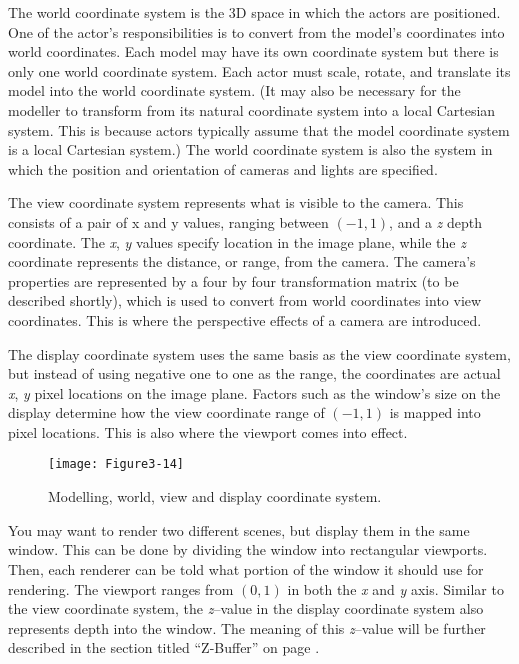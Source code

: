 The world coordinate system is the 3D space in which the actors are positioned. One of the actor's responsibilities is to convert from the model's coordinates into world coordinates. Each model may have its own coordinate system but there is only one world coordinate system. Each actor must scale, rotate, and translate its model into the world coordinate system. (It may also be necessary for the modeller to transform from its natural coordinate system into a local Cartesian system. This is because actors typically assume that the model coordinate system is a local Cartesian system.) The world coordinate system is also the system in which the position and orientation of cameras and lights are specified.

The view coordinate system represents what is visible to the camera. This consists of a pair of x and y values, ranging between $(-1,1)$, and a \emph{z} depth coordinate. The \emph{x}, \emph{y} values specify location in the image plane, while the \emph{z} coordinate represents the distance, or range, from the camera. The camera's properties are represented by a four by four transformation matrix (to be described shortly), which is used to convert from world coordinates into view coordinates. This is where the perspective effects of a camera are introduced.

The display coordinate system uses the same basis as the view coordinate system, but instead of using negative one to one as the range, the coordinates are actual \emph{x}, \emph{y} pixel locations on the image plane. Factors such as the window's size on the display determine how the view coordinate range of $(-1,1)$ is mapped into pixel locations. This is also where the viewport comes into effect.

\begin{figure}[!htb]
  \centering
  \texttt{[image: Figure3-14]}\\
  \caption{ Modelling, world, view and display coordinate system.}\label{fig:Figure3-14}
\end{figure}

You may want to render two different scenes, but display them in the same window. This can be done by dividing the window into rectangular viewports. Then, each renderer can be told what portion of the window it should use for rendering. The viewport ranges from $(0,1)$ in both the \emph{x} and \emph{y} axis. Similar to the view coordinate system, the \emph{z}--value in the display coordinate system also represents depth into the window. The meaning of this \emph{z}--value will be further described in the section titled ``Z-Buffer'' on page \pageref{Z-Buffer}.


